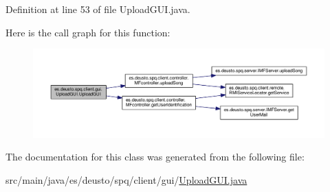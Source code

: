 Definition at line 53 of file Upload\+G\+U\+I.\+java.



Here is the call graph for this function\+:\nopagebreak
\begin{figure}[H]
\begin{center}
\leavevmode
\includegraphics[width=350pt]{classes_1_1deusto_1_1spq_1_1client_1_1gui_1_1_upload_g_u_i_a5e6597c257ae08e7e9e01bc04c54973b_cgraph}
\end{center}
\end{figure}




The documentation for this class was generated from the following file\+:\begin{DoxyCompactItemize}
\item 
src/main/java/es/deusto/spq/client/gui/\hyperlink{_upload_g_u_i_8java}{Upload\+G\+U\+I.\+java}\end{DoxyCompactItemize}
